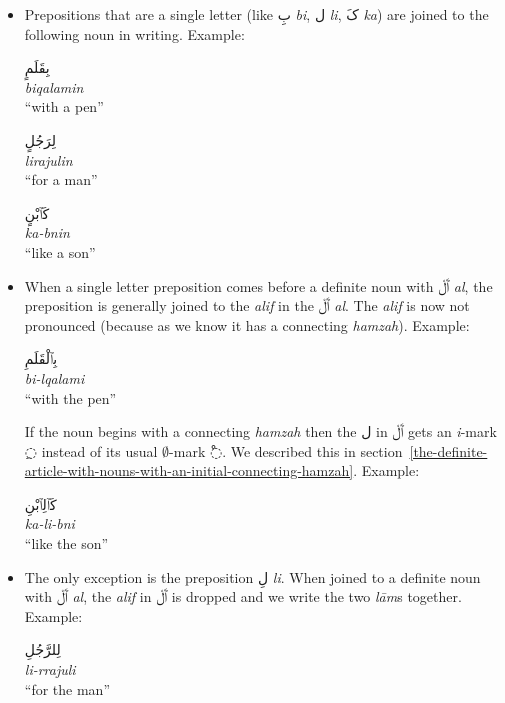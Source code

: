 \documentclass[
  10pt,
]{book}
\begin{document}
\begin{itemize}
\item
  Prepositions that are a single letter (like
  \foreignlanguage{arabic}{بِ} \emph{bi}, \foreignlanguage{arabic}{ل} \emph{li}, \foreignlanguage{arabic}{کَ} \emph{ka}) are joined to the following noun in writing. Example:

  \foreignlanguage{arabic}{بِقَلَمٍ}\\
  \emph{biqalamin}\\
  \enquote{with a pen}

  \foreignlanguage{arabic}{لِرَجُلٍ}\\
  \emph{lirajulin}\\
  \enquote{for a man}

  \foreignlanguage{arabic}{کَٱبْنٍ}\\
  \emph{ka-bnin}\\
  \enquote{like a son}
\item
  When a single letter preposition comes before a definite noun with \foreignlanguage{arabic}{ٱَلْ} \emph{al}, the preposition is generally joined to the \emph{alif} in the \foreignlanguage{arabic}{ٱَلْ} \emph{al}. The \emph{alif} is now not pronounced (because as we know it has a connecting \emph{hamzah}). Example:

  \foreignlanguage{arabic}{بِٱلْقَلَمِ}\\
  \emph{bi-lqalami}\\
  \enquote{with the pen}

  If the noun begins with a connecting \emph{hamzah} then the \foreignlanguage{arabic}{ل} in \foreignlanguage{arabic}{ٱَلْ} gets an \emph{i}-mark \foreignlanguage{arabic}{◌ِ} instead of its usual \(\emptyset\)-mark \foreignlanguage{arabic}{◌ْ}. We described this in
  section~\ref{the-definite-article-with-nouns-with-an-initial-connecting-hamzah}.
  Example:

  \foreignlanguage{arabic}{کَٱلِٱبْنِ}\\
  \emph{ka-li-bni}\\
  \enquote{like the son}
\item
  The only exception is the preposition \foreignlanguage{arabic}{لِ} \emph{li}. When joined to a definite noun with \foreignlanguage{arabic}{ٱَلْ} \emph{al}, the \emph{alif} in \foreignlanguage{arabic}{ٱَلْ} is dropped and we write the two \emph{lām}s together. Example:

  \foreignlanguage{arabic}{لِلرَّجُلِ}\\
  \emph{li-rrajuli}\\
  \enquote{for the man}


\end{itemize}
\end{document}
